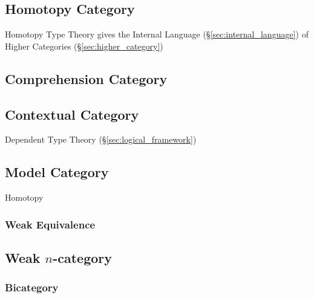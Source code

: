 \subsection{Homotopy Category}\label{sec:homotopy_category}

Homotopy Type Theory gives the Internal Language
(\S\ref{sec:internal_language}) of Higher Categories
(\S\ref{sec:higher_category})



\subsection{Comprehension Category}\label{sec:comprehension_category}

\subsection{Contextual Category}\label{sec:contextual_category}

Dependent Type Theory (\S\ref{sec:logical_framework})



\subsection{Model Category}\label{sec:model_category}

Homotopy



\subsubsection{Weak Equivalence}\label{sec:weak_equivalence}



\subsection{Weak $n$-category}\label{sec:weak_ncategory}

\subsubsection{Bicategory}\label{sec:bicategory}
